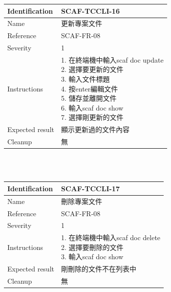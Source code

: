\documentclass{report}
\begin{document}
\begin{tabularx}{\textwidth}{
  |p{}%
  |p{}|%
  }
  \hline
  \centering Identification &  SCAF-TCCLI-16 \\
  \hline
  \centering Name & 更新專案文件 \\
  \hline
  \centering Reference & SCAF-FR-08 \\
  \hline
  \centering Severity & 1 \\
  \hline
  \centering Instructions & 
  \makecell[l]{
    1. 在終端機中輸入scaf doc update\\
    2. 選擇要更新的文件 \\
    3. 輸入文件標題 \\
    4. 按enter編輯文件\\
    5. 儲存並離開文件 \\
    6. 輸入scaf doc show \\
    7. 選擇剛更新的文件 \\
  }\\
  \hline
  \centering Expected result & 顯示更新過的文件內容 \\
  \hline
  \centering Cleanup & 無 \\
  \hline
\end{tabularx}
\\
\newline
\\

\begin{tabularx}{\textwidth}{
  |p{}%
  |p{}|%
  }
  \hline
  \centering Identification &  SCAF-TCCLI-17 \\
  \hline
  \centering Name & 刪除專案文件 \\
  \hline
  \centering Reference & SCAF-FR-08 \\
  \hline
  \centering Severity & 1 \\
  \hline
  \centering Instructions & 
  \makecell[l]{
    1. 在終端機中輸入scaf doc delete\\
    2. 選擇要刪除的文件 \\
    3. 輸入scaf doc show \\
  }\\
  \hline
  \centering Expected result & 剛刪除的文件不在列表中 \\
  \hline
  \centering Cleanup & 無 \\
  \hline
\end{tabularx}
\\
\newline
\\
\end{document}
